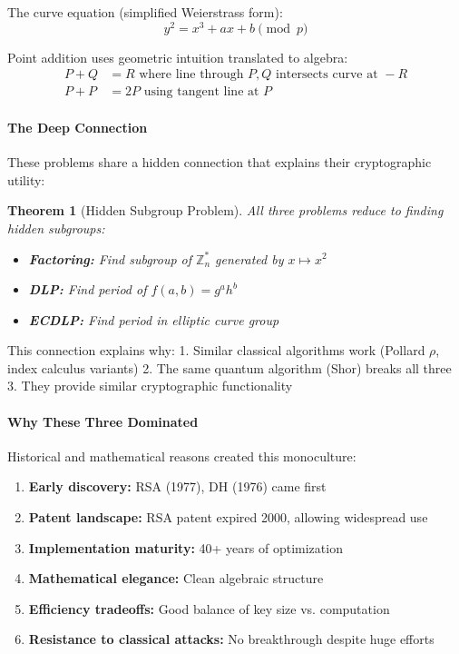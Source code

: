 \documentclass[11pt,a4paper]{article}
\newtheorem{theorem}{Theorem}
\begin{document}
The curve equation (simplified Weierstrass form):
\begin{equation}
y^2 = x^3 + ax + b \pmod{p}
\end{equation}

Point addition uses geometric intuition translated to algebra:
\begin{align}
P + Q &= R \text{ where line through } P,Q \text{ intersects curve at } -R\\
P + P &= 2P \text{ using tangent line at } P
\end{align}

\paragraph{The Deep Connection}

These problems share a hidden connection that explains their cryptographic utility:

\begin{theorem}[Hidden Subgroup Problem]
All three problems reduce to finding hidden subgroups:
\begin{itemize}
    \item \textbf{Factoring:} Find subgroup of $\mathbb{Z}_n^*$ generated by $x \mapsto x^2$
    \item \textbf{DLP:} Find period of $f(a,b) = g^a h^b$
    \item \textbf{ECDLP:} Find period in elliptic curve group
\end{itemize}
\end{theorem}

This connection explains why:
1. Similar classical algorithms work (Pollard $\rho$, index calculus variants)
2. The same quantum algorithm (Shor) breaks all three
3. They provide similar cryptographic functionality

\paragraph{Why These Three Dominated}

Historical and mathematical reasons created this monoculture:

\begin{enumerate}
    \item \textbf{Early discovery:} RSA (1977), DH (1976) came first
    \item \textbf{Patent landscape:} RSA patent expired 2000, allowing widespread use
    \item \textbf{Implementation maturity:} 40+ years of optimization
    \item \textbf{Mathematical elegance:} Clean algebraic structure
    \item \textbf{Efficiency tradeoffs:} Good balance of key size vs. computation
    \item \textbf{Resistance to classical attacks:} No breakthrough despite huge efforts
\end{enumerate}
\end{document}
